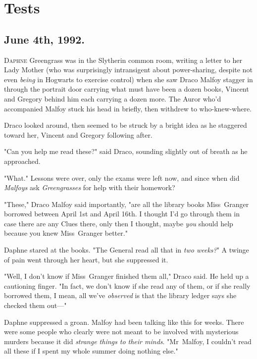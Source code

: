 \chapter{Tests}

\section{June 4th, 1992.}

\lettrine{D}{aphne} Greengrass was in the Slytherin common room, writing a letter to her
Lady Mother (who was surprisingly intransigent about power-sharing, despite not
even \emph{being} in Hogwarts to exercise control) when she saw Draco Malfoy
stagger in through the portrait door carrying what must have been a dozen
books, Vincent and Gregory behind him each carrying a dozen more. The Auror
who’d accompanied Malfoy stuck his head in briefly, then withdrew to
who-knew-where.

Draco looked around, then seemed to be struck by a bright idea as he staggered
toward her, Vincent and Gregory following after.

"Can you help me read these?" said Draco, sounding slightly out of breath as he
approached.

"What." Lessons were over, only the exams were left now, and since when
did \emph{Malfoys} ask \emph{Greengrasses} for help with their homework?

"These," Draco Malfoy said importantly, "are all the library books Miss~Granger
borrowed between April 1st and April 16th. I thought I’d go through them in
case there are any Clues there, only then I thought, maybe \emph{you} should
help because you knew Miss~Granger better."

Daphne stared at the books. "The General read all that in \emph{two weeks?}" A
twinge of pain went through her heart, but she suppressed it.

"Well, I don’t know if Miss~Granger finished them all," Draco said. He held up
a cautioning finger. "In fact, we don’t know if she read any of them, or if she
really borrowed them, I mean, all we’ve \emph{observed} is that the library
ledger says she checked them out—"

Daphne suppressed a groan. Malfoy had been talking like this for weeks. There
were some people who clearly were not meant to be involved with mysterious
murders because it did \emph{strange things to their minds}. "Mr~Malfoy, I
couldn’t read all these if I spent my whole summer doing nothing else."


